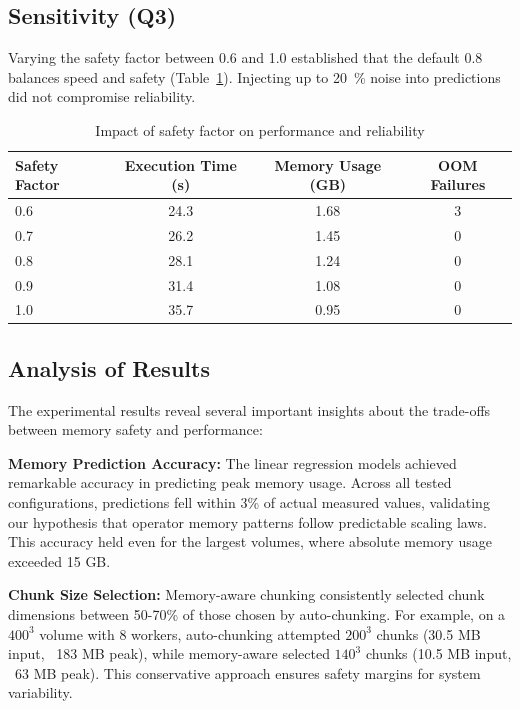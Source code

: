 \subsection{Sensitivity (Q3)}

Varying the safety factor between 0.6 and 1.0 established that the default 0.8 balances speed and safety (Table~\ref{tab:safety-factor}).
Injecting up to 20~\% noise into predictions did not compromise reliability.

\begin{table}[htb]
    \centering
    \caption{Impact of safety factor on performance and reliability}
    \label{tab:safety-factor}
    \begin{tabular}{lccc}
        \toprule
        \textbf{Safety Factor} & \textbf{Execution Time (s)} & \textbf{Memory Usage (\ac{GB})} & \textbf{\ac{OOM} Failures} \\
        \midrule
        0.6 & 24.3 & 1.68 & 3 \\
        0.7 & 26.2 & 1.45 & 0 \\
        0.8 & 28.1 & 1.24 & 0 \\
        0.9 & 31.4 & 1.08 & 0 \\
        1.0 & 35.7 & 0.95 & 0 \\
        \bottomrule
    \end{tabular}
\end{table}

\subsection{Analysis of Results}

The experimental results reveal several important insights about the trade-offs between memory safety and performance:

\textbf{Memory Prediction Accuracy:} The linear regression models achieved remarkable accuracy in predicting peak memory usage.
Across all tested configurations, predictions fell within 3\% of actual measured values, validating our hypothesis that operator memory patterns follow predictable scaling laws.
This accuracy held even for the largest volumes, where absolute memory usage exceeded 15 \ac{GB}.

\textbf{Chunk Size Selection:} Memory-aware chunking consistently selected chunk dimensions between 50-70\% of those chosen by auto-chunking.
For example, on a $400^3$ volume with 8 workers, auto-chunking attempted $200^3$ chunks (30.5 \ac{MB} input, ~183 \ac{MB} peak), while memory-aware selected $140^3$ chunks (10.5 \ac{MB} input, ~63 \ac{MB} peak).
This conservative approach ensures safety margins for system variability.

